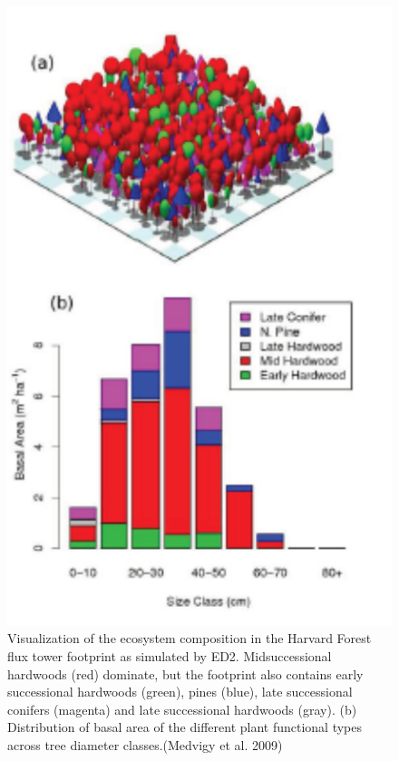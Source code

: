 \documentclass[12pt,oneside]{book}
\begin{document}
\begin{figure}

{\centering \includegraphics[width=0.8\linewidth]{figures/chap6/f618_ED_harvard} 

}

\caption{ Visualization of the ecosystem composition in the Harvard Forest flux tower footprint as simulated by ED2. Midsuccessional hardwoods (red) dominate, but the footprint also contains early successional hardwoods (green), pines (blue), late successional conifers (magenta) and late successional hardwoods (gray). (b) Distribution of basal area of the different plant functional types across tree diameter classes.(Medvigy et al. 2009)}\label{fig:f618}
\end{figure}
\end{document}
